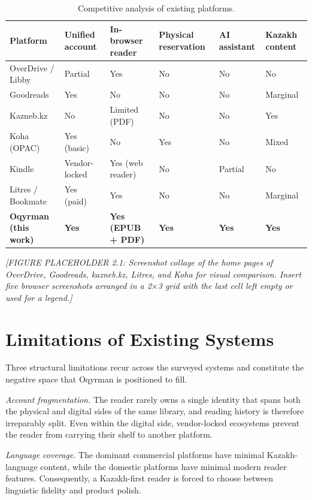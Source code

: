\documentclass[12pt,a4paper]{report}
\begin{document}
\begin{table}[H]
\centering
\caption{Competitive analysis of existing platforms.}
\label{tab:competitive}
\small
\begin{tabularx}{\textwidth}{lXXXXX}
\toprule
\textbf{Platform} & \textbf{Unified account} & \textbf{In-browser reader} &
\textbf{Physical reservation} & \textbf{AI assistant} & \textbf{Kazakh
content} \\
\midrule
OverDrive / Libby & Partial & Yes & No & No & No \\
Goodreads        & Yes & No & No & No & Marginal \\
Kazneb.kz        & No & Limited (PDF) & No & No & Yes \\
Koha (OPAC)      & Yes (basic) & No & Yes & No & Mixed \\
Kindle           & Vendor-locked & Yes (web reader) & No & Partial & No \\
Litres / Bookmate & Yes (paid) & Yes & No & No & Marginal \\
\textbf{Oqyrman (this work)} & \textbf{Yes} & \textbf{Yes (EPUB + PDF)} &
\textbf{Yes} & \textbf{Yes} & \textbf{Yes} \\
\bottomrule
\end{tabularx}
\end{table}

\textit{[FIGURE PLACEHOLDER 2.1: Screenshot collage of the home pages of
OverDrive, Goodreads, kazneb.kz, Litres, and Koha for visual comparison.
Insert five browser screenshots arranged in a 2$\times$3 grid with the last
cell left empty or used for a legend.]}

\section{Limitations of Existing Systems}

Three structural limitations recur across the surveyed systems and
constitute the negative space that Oqyrman is positioned to fill.

\textit{Account fragmentation.} The reader rarely owns a single identity
that spans both the physical and digital sides of the same library, and
reading history is therefore irreparably split. Even within the digital
side, vendor-locked ecosystems prevent the reader from carrying their
shelf to another platform.

\textit{Language coverage.} The dominant commercial platforms have
minimal Kazakh-language content, while the domestic platforms have minimal
modern reader features. Consequently, a Kazakh-first reader is forced to
choose between linguistic fidelity and product polish.
\end{document}
